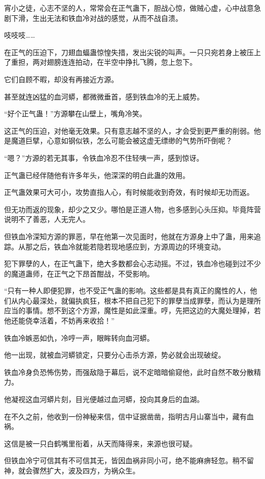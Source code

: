\begin{this_body}
宵小之徒，心志不坚的人，常常会在正气蛊下，胆战心惊，做贼心虚，心中战意急剧下滑，生出无法和铁血冷对战的感觉，从而不战自溃。

吱吱吱……

在正气的压迫下，刀翅血蝠蛊惊惶失措，发出尖锐的叫声。一只只宛若身上被压上了重担，两对翅膀连连拍动，在半空中挣扎飞腾，忽上忽下。

它们自顾不暇，却没有再接近方源。

甚至就连凶猛的血河蟒，都微微垂首，感到铁血冷的无上威势。

“好个正气蛊！”方源攀在山壁上，嘴角冷笑。

这正气的压迫，对他毫无效果。只有意志越不坚的人，才会受到更严重的削弱。他是魔道巨擘，心意如钢似铁，怎么可能会被这虚无缥缈的气势所吓倒呢？

“嗯？”方源的若无其事，令铁血冷忍不住轻咦一声，感到惊讶。

正气蛊已经伴随他有许多年头，他深深的明白此蛊的效用。

正气蛊效果可大可小，攻势直指人心，有时候能收到奇效，有时候却无功而返。

但无功而返的现象，却少之又少。哪怕是正道人物，也多感到心头压抑。毕竟阵营说明不了善恶，人无完人。

但铁血冷深知方源的罪恶，早在他第一次见面时，他就在方源身上中了蛊，用来追踪。从那之后，铁血冷就能若隐若现地感应到，方源周边的环境变动。

犯下罪孽的人，在正气蛊下，绝大多数都会心志动摇。不过，铁血冷也碰到过不少的魔道蛊师，在正气之下昂首酣战，不受影响。

“只有一种人即便犯罪，也不受正气蛊的影响。这些都是具有真正的魔性的人，他们从内心最深处，就偏执疯狂，根本不把自己犯下的罪孽当成罪孽，而认为是理所应当的事情。想不到这个方源，魔性是如此深重。哼，先把这边的大魔处理掉，若他还能侥幸活着，不妨再来收拾！”

铁血冷嫉恶如仇，冷哼一声，眼眸转向血河蟒。

他一出现，就被血河蟒锁定，只要分心击杀方源，势必就会出现破绽。

铁血冷身负恐怖伤势，而强敌隐于幕后，说不定暗暗偷窥他，此时自然不敢分散精力。

他凝视这血河蟒片刻，目光便越过血河蟒，投向其身后的血湖。

在不久之前，他收到一份神秘来信，信中证据凿凿，指明古月山寨当中，藏有血祸。

这信是被一只白鹤嘴里衔着，从天而降得来，来源也很可疑。

但铁血冷宁可信其有不可信其无，皆因血祸非同小可，绝不能麻痹轻忽。稍不留神，就会骤然扩大，波及四方，为祸众生。


\end{this_body}
